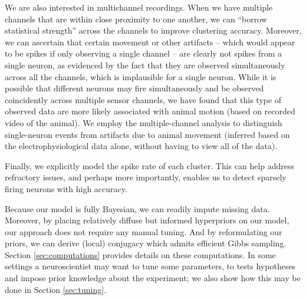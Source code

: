 \documentclass[journal]{IEEEtran}
\begin{document}
We are also interested in multichannel recordings.  When we have multiple channels that are within close proximity to one another, we can ``borrow statistical strength'' across the channels to improve clustering accuracy.  Moreover, we can ascertain that certain movement or other artifacts -- which would appear to be spikes if only observing a single channel -- are clearly not spikes from a single neuron, as evidenced by the fact that they are observed simultaneously across all the channels, which is implausible for a single neuron. While it is possible that different neurons may fire simultaneously and be observed coincidently across multiple sensor channels, we have found that this type of observed data are more likely associated with animal motion (based on recorded video of the animal). We employ the multiple-channel analysis to distinguish single-neuron events from artifacts due to animal movement (inferred based on the electrophysiological data alone, without having to view all of the data). 

Finally, we explicitly model the spike rate of each cluster.  This can help address refractory issues, and perhaps more importantly, enables us to detect sparsely firing neurons with high accuracy.

Because our model is fully Bayesian, we can readily impute missing data.  Moreover, by placing relatively diffuse but informed hyperpriors on our model, our approach does not require any manual tuning. And by reformulating our priors, we can derive (local) conjugacy which admits efficient Gibbs sampling.  Section \ref{sec:computations} provides details on these computations. In some settings a neuroscientist may want to tune some parameters, to tests hypotheses and impose prior knowledge about the experiment; we also show how this may be done in Section \ref{sec:tuning}.


\end{document}
